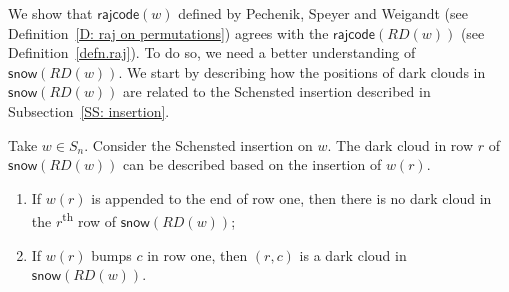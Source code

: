 \documentclass[ALCO]{cedram}
\newcommand{\snow}{\mathsf{snow}}
\newcommand{\rajcode}{\mathsf{rajcode}}
\begin{document}
We show
that $\rajcode(w)$ defined by Pechenik, Speyer and Weigandt
(see Definition~\ref{D: raj on permutations})
agrees with the $\rajcode(RD(w))$ (see Definition~\ref{defn.raj}). 
To do so, 
we need a better understanding of $\snow(RD(w))$. 
We start by describing how the positions of dark clouds in $\snow(RD(w))$ 
are related to the Schensted insertion described in Subsection~\ref{SS: insertion}.

\begin{prop}\label{prop: rsk and dark clouds}
Take $w \in S_n$.
Consider the Schensted insertion on $w$.
The dark cloud in row $r$ of $\snow(RD(w))$ can be described 
based on the insertion of $w(r)$.
\begin{enumerate}
\item If $w(r)$ is appended to the end of row one, 
then there is no dark cloud in the $r$\textsuperscript{th} row of $\snow(RD(w))$;
\item If $w(r)$ bumps $c$ in row one, 
then $(r, c)$ is a dark cloud in $\snow(RD(w))$.
\end{enumerate}
\end{prop}
\end{document}
